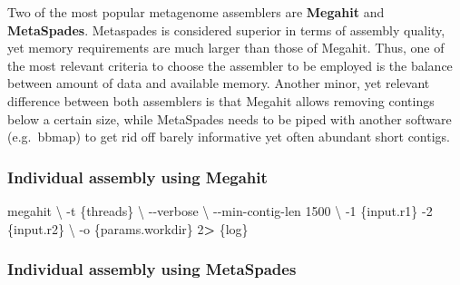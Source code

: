 \documentclass[
]{book}
\newenvironment{Shaded}{\begin{snugshade}}{\end{snugshade}}
\newcommand{\AttributeTok}[1]{\textcolor[rgb]{0.77,0.63,0.00}{#1}}
\newcommand{\DataTypeTok}[1]{\textcolor[rgb]{0.13,0.29,0.53}{#1}}
\newcommand{\DecValTok}[1]{\textcolor[rgb]{0.00,0.00,0.81}{#1}}
\newcommand{\ExtensionTok}[1]{#1}
\newcommand{\NormalTok}[1]{#1}
\newcommand{\OperatorTok}[1]{\textcolor[rgb]{0.81,0.36,0.00}{\textbf{#1}}}
\begin{document}
Two of the most popular metagenome assemblers are \textbf{Megahit} and \textbf{MetaSpades}. Metaspades is considered superior in terms of assembly quality, yet memory requirements are much larger than those of Megahit. Thus, one of the most relevant criteria to choose the assembler to be employed is the balance between amount of data and available memory. Another minor, yet relevant difference between both assemblers is that Megahit allows removing contings below a certain size, while MetaSpades needs to be piped with another software (e.g.~bbmap) to get rid off barely informative yet often abundant short contigs.

\hypertarget{individual-assembly-using-megahit}{%
\subsubsection*{Individual assembly using Megahit}\label{individual-assembly-using-megahit}}

\begin{Shaded}
\begin{Highlighting}[]
\ExtensionTok{megahit} \DataTypeTok{\textbackslash{}}
    \AttributeTok{{-}t}\NormalTok{ \{threads\} }\DataTypeTok{\textbackslash{}}
    \AttributeTok{{-}{-}verbose} \DataTypeTok{\textbackslash{}}
    \AttributeTok{{-}{-}min{-}contig{-}len}\NormalTok{ 1500 }\DataTypeTok{\textbackslash{}}
    \AttributeTok{{-}1}\NormalTok{ \{input.r1\} }\AttributeTok{{-}2}\NormalTok{ \{input.r2\} }\DataTypeTok{\textbackslash{}}
    \AttributeTok{{-}o}\NormalTok{ \{params.workdir\}}
    \DecValTok{2}\OperatorTok{\textgreater{}}\NormalTok{ \{log\}}
\end{Highlighting}
\end{Shaded}

\hypertarget{individual-assembly-using-metaspades}{%
\subsubsection*{Individual assembly using MetaSpades}\label{individual-assembly-using-metaspades}}
\end{document}
